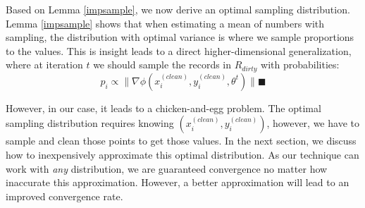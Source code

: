 \iffalse
The variance of this estimate is given by:
\[
Var(\mu) = \mathbb{E}(\mu^2)-\mathbb{E}(\mu)^2
\] 
Since the estimate is unbiased, we can replace $\mathbb{E}(\mu)$ with the average of $A$:
\[
Var(\mu) = \mathbb{E}(\mu^2)-\bar{A}^2
\]
Since $\bar{A}$ is deterministic, we can remove that term during minimization.
Furthermore, we can write $\mathbb{E}(\mu^2)$ as:
\[
\mathbb{E}(\mu^2) = \frac{1}{n^2}\sum_i^n \frac{a_i^2}{p_i}
\]
Then, we can solve the following optimization problem (removing the proportionality of $\frac{1}{n^2}$) over the set of weights $P=\{p(a_i)\}$:
\[
\min_{P} \sum_i^N \frac{a_i^2}{p_i}
\]
\[
\text{subject to: } P > 0, \sum P = 1
\]
Applying Lagrange multipliers, an equivalent unconstrained optimization problem is:
\[
\min_{P > 0,\lambda > 0} \sum_i^N \frac{a_i^2}{p_i} + \lambda \cdot (\sum P - 1)
\]
If, we take the derivatives with respect to $p_i$ and set them equal to zero:
\[
-\frac{a_i^2}{2 \cdot p_i^2} + \lambda = 0
\]
If, we take the derivative with respect to $\lambda$ and set it equal to zero:
\[
\sum P - 1
\]
Solving the system of equations, we get:
\[
p_i = \frac{\mid a_i \mid }{\sum_i \mid a_i \mid}
\]
\fi

Based on Lemma \ref{impsample}, we now derive an optimal sampling distribution.
Lemma \ref{impsample} shows that when estimating a mean of numbers with sampling, the distribution with optimal variance is where we sample proportions to the values.
This is insight leads to a direct higher-dimensional generalization, where at iteration $t$ we should sample the records in $R_{dirty}$ with probabilities:
\[
p_i \propto \|\nabla\phi(x^{(clean)}_i,y^{(clean)}_i,\theta^t)\| \blacksquare
\]

However, in our case, it leads to a chicken-and-egg problem.
The optimal sampling distribution requires knowing $(x^{(clean)}_i,y^{(clean)}_i)$, however, we have to sample and clean those points to get those values.
In the next section, we discuss how to inexpensively approximate this optimal distribution.
As our technique can work with \emph{any} distribution, we are guaranteed convergence no matter how inaccurate this approximation.
However, a better approximation will lead to an improved convergence rate.
